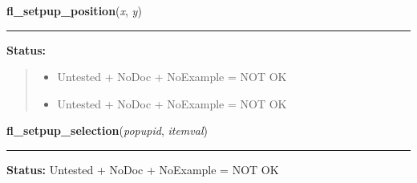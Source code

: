     \vspace{0.5ex}

\hspace{.8\funcindent}\begin{boxedminipage}{\funcwidth}

    \raggedright \textbf{fl\_setpup\_position}(\textit{x}, \textit{y})

    \vspace{-1.5ex}

    \rule{\textwidth}{0.5\fboxrule}
\setlength{\parskip}{2ex}
\setlength{\parskip}{1ex}
\textbf{Status:}
\begin{quote}
  \begin{itemize}

  \item
    \setlength{\parskip}{0.6ex}
Untested + NoDoc + NoExample = NOT OK



  \item Untested + NoDoc + NoExample = NOT OK



\end{itemize}

\end{quote}

    \end{boxedminipage}

    \label{xformslib:library:fl_setpup_selection}

    \vspace{0.5ex}

\hspace{.8\funcindent}\begin{boxedminipage}{\funcwidth}

    \raggedright \textbf{fl\_setpup\_selection}(\textit{popupid}, \textit{itemval})

    \vspace{-1.5ex}

    \rule{\textwidth}{0.5\fboxrule}
\setlength{\parskip}{2ex}
\setlength{\parskip}{1ex}
\textbf{Status:} Untested + NoDoc + NoExample = NOT OK



    \end{boxedminipage}

    \label{xformslib:library:fl_setpup_shadow}

